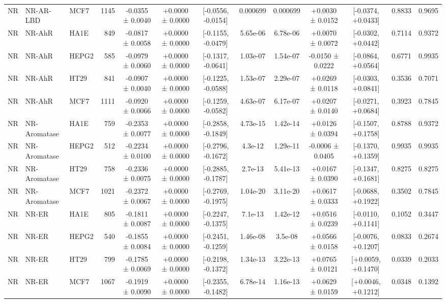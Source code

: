 \begin{landscape}
\begin{longtable}{lll r ccccc cccc}
NR & NR-AR-LBD & MCF7 & 1145 & -0.0355 ± 0.0040 & +0.0000 ± 0.0000 & [-0.0556, -0.0154] & 0.000699 & 0.000699 & +0.0030 ± 0.0152 & [-0.0374, +0.0433] & 0.8833 & 0.9695 \\
\addlinespace[1.5pt]
NR & NR-AhR & HA1E & 849 & -0.0817 ± 0.0058 & +0.0000 ± 0.0000 & [-0.1155, -0.0479] & 5.65e-06 & 6.78e-06 & +0.0070 ± 0.0072 & [-0.0302, +0.0442] & 0.7114 & 0.9372 \\
NR & NR-AhR & HEPG2 & 585 & -0.0979 ± 0.0060 & +0.0000 ± 0.0000 & [-0.1317, -0.0641] & 1.03e-07 & 1.54e-07 & -0.0150 ± 0.0222 & [-0.0864, +0.0564] & 0.6771 & 0.9935 \\
NR & NR-AhR & HT29 & 841 & -0.0907 ± 0.0040 & +0.0000 ± 0.0000 & [-0.1225, -0.0588] & 1.53e-07 & 2.29e-07 & +0.0269 ± 0.0118 & [-0.0303, +0.0841] & 0.3536 & 0.7071 \\
NR & NR-AhR & MCF7 & 1111 & -0.0920 ± 0.0066 & +0.0000 ± 0.0000 & [-0.1259, -0.0582] & 4.63e-07 & 6.17e-07 & +0.0207 ± 0.0140 & [-0.0271, +0.0684] & 0.3923 & 0.7845 \\
\addlinespace[1.5pt]
NR & NR-Aromatase & HA1E & 759 & -0.2353 ± 0.0077 & +0.0000 ± 0.0000 & [-0.2858, -0.1849] & 4.73e-15 & 1.42e-14 & +0.0126 ± 0.0394 & [-0.1507, +0.1758] & 0.8788 & 0.9372 \\
NR & NR-Aromatase & HEPG2 & 512 & -0.2234 ± 0.0100 & +0.0000 ± 0.0000 & [-0.2796, -0.1672] & 4.3e-12 & 1.29e-11 & -0.0006 ± 0.0405 & [-0.1370, +0.1359] & 0.9935 & 0.9935 \\
NR & NR-Aromatase & HT29 & 758 & -0.2336 ± 0.0075 & +0.0000 ± 0.0000 & [-0.2885, -0.1787] & 2.7e-13 & 5.41e-13 & +0.0167 ± 0.0390 & [-0.1347, +0.1681] & 0.8275 & 0.8275 \\
NR & NR-Aromatase & MCF7 & 1021 & -0.2372 ± 0.0067 & +0.0000 ± 0.0000 & [-0.2769, -0.1975] & 1.04e-20 & 3.11e-20 & +0.0617 ± 0.0333 & [-0.0688, +0.1922] & 0.3502 & 0.7845 \\
\addlinespace[1.5pt]
NR & NR-ER & HA1E & 805 & -0.1811 ± 0.0087 & +0.0000 ± 0.0000 & [-0.2247, -0.1375] & 7.1e-13 & 1.42e-12 & +0.0516 ± 0.0239 & [-0.0110, +0.1141] & 0.1052 & 0.3447 \\
NR & NR-ER & HEPG2 & 540 & -0.1855 ± 0.0084 & +0.0000 ± 0.0000 & [-0.2451, -0.1259] & 1.46e-08 & 3.5e-08 & +0.0566 ± 0.0158 & [-0.0076, +0.1207] & 0.0833 & 0.2674 \\
NR & NR-ER & HT29 & 799 & -0.1785 ± 0.0069 & +0.0000 ± 0.0000 & [-0.2198, -0.1372] & 1.34e-13 & 3.22e-13 & +0.0765 ± 0.0121 & [+0.0059, +0.1470] & 0.0339 & 0.2033 \\
NR & NR-ER & MCF7 & 1067 & -0.1919 ± 0.0090 & +0.0000 ± 0.0000 & [-0.2355, -0.1482] & 6.78e-14 & 1.16e-13 & +0.0629 ± 0.0159 & [+0.0046, +0.1212] & 0.0348 & 0.1392 \\

\end{longtable}
\end{landscape}
